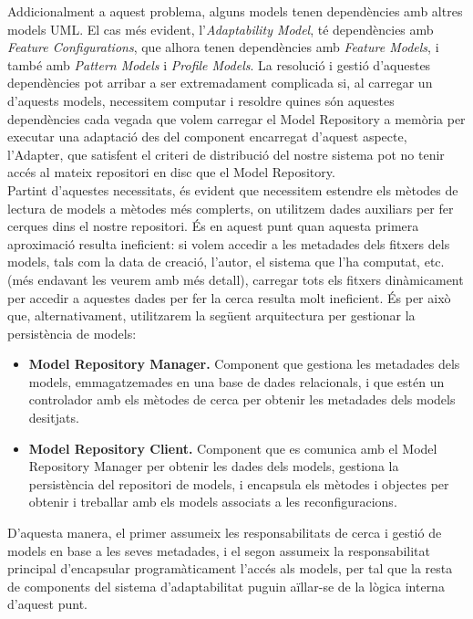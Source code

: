 Addicionalment a aquest problema, alguns models tenen dependències amb altres models UML. El cas més evident, l'\textit{Adaptability Model}, té dependències amb \textit{Feature Configurations}, que alhora tenen dependències amb \textit{Feature Models}, i també amb \textit{Pattern Models} i \textit{Profile Models}. La resolució i gestió d'aquestes dependències pot arribar a ser extremadament complicada si, al carregar un d'aquests models, necessitem computar i resoldre quines són aquestes dependències cada vegada que volem carregar el Model Repository a memòria per executar una adaptació des del component encarregat d'aquest aspecte, l'Adapter, que satisfent el criteri de distribució del nostre sistema pot no tenir accés al mateix repositori en disc que el Model Repository. \\

Partint d'aquestes necessitats, és evident que necessitem estendre els mètodes de lectura de models a mètodes més complerts, on utilitzem dades auxiliars per fer cerques dins el nostre repositori. És en aquest punt quan aquesta primera aproximació resulta ineficient: si volem accedir a les metadades dels fitxers dels models, tals com la data de creació, l'autor, el sistema que l'ha computat, etc. (més endavant les veurem amb més detall), carregar tots els fitxers dinàmicament per accedir a aquestes dades per fer la cerca resulta molt ineficient. És per això que, alternativament, utilitzarem la següent arquitectura per gestionar la persistència de models:

\begin{itemize}
\item \textbf{Model Repository Manager.} Component que gestiona les metadades dels models, emmagatzemades en una base de dades relacionals, i que estén un controlador amb els mètodes de cerca per obtenir les metadades dels models desitjats.
\item \textbf{Model Repository Client.} Component que es comunica amb el Model Repository Manager per obtenir les dades dels models, gestiona la persistència del repositori de models, i encapsula els mètodes i objectes per obtenir i treballar amb els models associats a les reconfiguracions.
\end{itemize}

D'aquesta manera, el primer assumeix les responsabilitats de cerca i gestió de models en base a les seves metadades, i el segon assumeix la responsabilitat principal d'encapsular programàticament l'accés als models, per tal que la resta de components del sistema d'adaptabilitat puguin aïllar-se de la lògica interna d'aquest punt.

